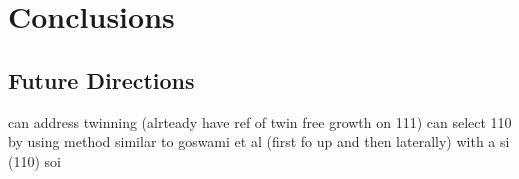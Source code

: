 \chapter{Conclusions}
\section{Future Directions}
can address twinning (alrteady have ref of twin free growth on 111)
can select 110 by using method similar to goswami et al (first fo up and then laterally) with a si (110) soi